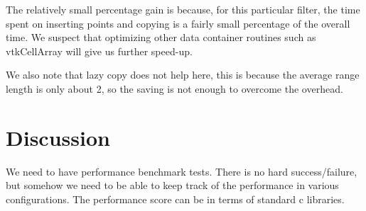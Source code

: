 \documentclass{article}
\begin{document}
The relatively small percentage gain is because, for this particular
filter, the time spent on inserting points and copying is a fairly
small percentage of the overall time. We suspect that optimizing
other data container routines such as vtkCellArray will give us
further speed-up.

We also note that lazy copy does not help here, this is because the
average range length is only about 2, so the saving is not enough to
overcome the overhead.


\section{Discussion}


We need to have performance benchmark tests.  There is no hard
success/failure, but somehow we need to be able to keep track of the
performance in various configurations. The performance score can be in
terms of standard c libraries.
\end{document}
